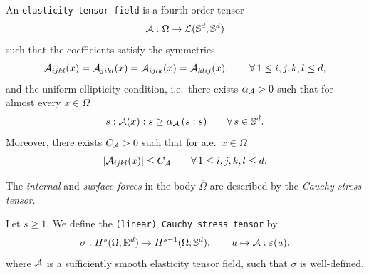 \begin{definition}\label{def:elastfield}
	An {\tt elasticity tensor field} is a fourth order tensor
	\begin{equation*}
		{\mathcal A}:\Omega\to {\mathcal L}({\mathbb S}^d;{\mathbb S}^d)
	\end{equation*}
	such that the coefficients satisfy the symmetries
	\begin{equation*}
		{\mathcal A}_{ijkl}(x)={\mathcal A}_{jikl}(x)={\mathcal A}_{ijlk}(x)={\mathcal A}_{klij}(x),
		\qquad \forall\,1\le i,j,k,l\le d,
	\end{equation*}
	and the uniform ellipticity condition, i.e.\ there exists $\alpha_{\mathcal A}>0$ such that for almost every $x\in\Omega$
	\begin{equation*}
		s:{\mathcal A}(x):s \ge \alpha_{\mathcal A}\, (s:s)\qquad \forall\,s\in {\mathbb S}^d.
	\end{equation*}
	Moreover, there exists $C_{\mathcal A}>0$ such that for a.e.\ $x\in\Omega$
	\begin{equation*}
		|{\mathcal A}_{ijkl}(x)|\le C_{\mathcal A} \qquad \forall\,1\le i,j,k,l\le d.
	\end{equation*}
\end{definition}

The {\em internal} and {\em surface forces} in the body $\overline{\Omega}$ are described by the {\em Cauchy stress tensor}.

\begin{definition}
	Let $s\ge 1$. We define the {\tt (linear) Cauchy stress tensor} by
	\begin{equation*}
		\sigma: H^{s}(\Omega;{\mathbb R}^d)\to H^{s-1}(\Omega;{\mathbb S}^d),\qquad u\mapsto {\mathcal A} : \varepsilon(u),
	\end{equation*}
	where ${\mathcal A}$ is a sufficiently smooth elasticity tensor field, such that $\sigma$ is well-defined.
\end{definition}

